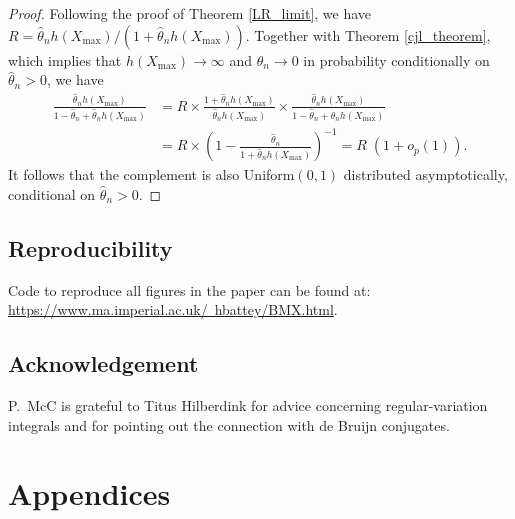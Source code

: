 \documentclass[11pt]{article}
\theoremstyle{definition}
\begin{document}
\begin{proof}
	Following the proof of Theorem \ref{LR_limit}, we have $R = \hat{\theta}_n h(X_{\max})/(1+\hat{\theta}_n h(X_{\max}))$. Together with Theorem \ref{cjl_theorem}, which implies that $h(X_{\max}) \to \infty$ and $\hat{\theta}_n \to 0$ in probability conditionally on $\hat{\theta}_n>0$, we have
	\begin{align*}
	\frac {\hat\theta_n h(X_{\max})} {1 - \hat\theta_n + \hat\theta_n h(X_{\max})} &= R \times \frac{1+\hat{\theta}_n h(X_{\max})}{\hat{\theta}_n h(X_{\max})} \times \frac {\hat\theta_n h(X_{\max})} {1 - \hat\theta_n + \hat\theta_n h(X_{\max})} \\
	&= R \times \left(1 - \frac{\hat{\theta}_n}{1+\hat{\theta}_n h(X_{\max})} \right)^{-1} = R\;(1+o_p(1)).
	\end{align*}
	It follows that the complement is also Uniform$(0,1)$ distributed asymptotically, conditional on $\hat{\theta}_n>0$.
\end{proof}



\subsection*{Reproducibility} Code to reproduce all figures in the paper can be found at: \newline \href{https://www.ma.imperial.ac.uk/~hbattey/codeBMX.html}{https://www.ma.imperial.ac.uk/~hbattey/BMX.html}. 



\subsection*{Acknowledgement}
P.~McC is grateful to Titus Hilberdink for advice concerning regular-variation integrals and for pointing out the connection with de Bruijn conjugates.

\bigskip
\bigskip

	\section*{Appendices}
\end{document}
